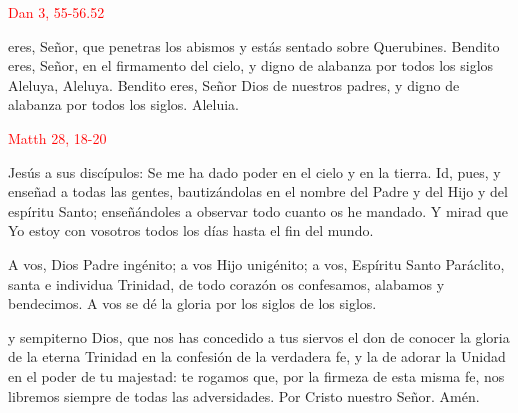 \documentclass[10pt]{article}
\begin{document}
\begin{multicols}{2}
      \vspace{2mm}

      \hfill\textcolor{red}{Dan 3, 55-56.52}

      eres, Señor, que penetras los abismos y estás sentado sobre Querubines. Bendito eres, Señor, en el firmamento del cielo, y digno de alabanza por todos los siglos
      Aleluya, Aleluya. Bendito eres, Señor Dios de nuestros padres, y digno de alabanza por todos los siglos. Aleluia.

      \vspace{2mm}

      \hfill\textcolor{red}{Matth 28, 18-20}

      Jesús a sus discípulos: Se me ha dado poder en el cielo y en la tierra. Id, pues, y enseñad a todas las gentes, bautizándolas en el nombre del Padre y del Hijo y del espíritu
      Santo; enseñándoles a observar todo cuanto os he mandado. Y mirad que Yo estoy con vosotros todos los días hasta el fin del mundo.

      \vspace{2mm}

      \begin{otherlanguage}{latin}
            

            \vspace{1mm}

            

            \vspace{1mm}

            
      \end{otherlanguage}

      \vspace{2mm}

      A vos, Dios Padre ingénito; a vos Hijo unigénito; a vos, Espíritu Santo Paráclito, santa e individua Trinidad, de todo corazón os confesamos, alabamos y bendecimos. A vos se dé
      la gloria por los siglos de los siglos.

      \vspace{2mm}


      \vspace{2mm}

      y sempiterno Dios, que nos has concedido a tus siervos el don de conocer la gloria de la eterna Trinidad en la confesión de la verdadera fe,
      y la de adorar la Unidad en el poder de tu majestad: te rogamos que, por la firmeza de esta misma fe, nos libremos siempre de todas las adversidades. Por Cristo nuestro Señor.
      Amén.

\end{multicols}
\end{document}
